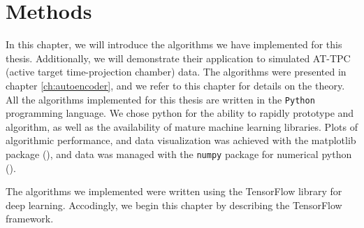 \chapter{Methods}

In this chapter, we will introduce the algorithms we have implemented for this thesis. Additionally, we will demonstrate their application to simulated AT-TPC (active target time-projection chamber) data. The algorithms were presented in chapter \ref{ch:autoencoder}, and we refer to this chapter for details on the theory. All the algorithms implemented for this thesis are written in the \lstinline{Python} programming language. We chose python for the ability to rapidly prototype and algorithm, as well as the availability of mature machine learning libraries. Plots of algorithmic performance, and data visualization was achieved with the matplotlib package (\cite{matplotlib}), and data was managed with the \lstinline{numpy} package for numerical python (\cite{numpy}).

The algorithms we implemented were written using the TensorFlow library for deep learning. Accodingly, we begin this chapter by describing the TensorFlow framework. 
